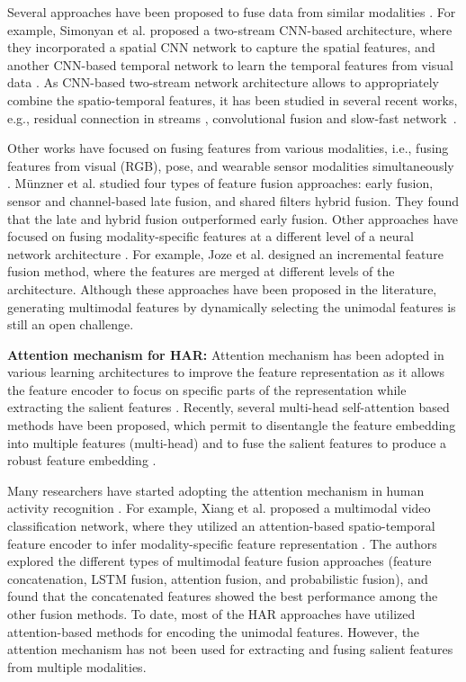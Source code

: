 \documentclass[runningheads]{llncs}
\begin{document}
Several approaches have been proposed to fuse data from similar modalities \cite{two_stream_cnn,sp_two_stream_residual,sp_mul_motion_gating,conv_fusion,zhang2018fusing}. For example, Simonyan et al. proposed a two-stream CNN-based architecture, where they incorporated a spatial CNN network to capture the spatial features, and another CNN-based temporal network to learn the temporal features from visual data \cite{two_stream_cnn}.  As CNN-based two-stream network architecture allows to appropriately combine the spatio-temporal features, it has been studied in several recent works, e.g., residual connection in streams \cite{sp_two_stream_residual}, convolutional fusion \cite{conv_fusion} and slow-fast network~\cite{slowfast}.



Other works have focused on fusing features from various modalities, i.e., fusing features from visual (RGB), pose, and wearable sensor modalities simultaneously \cite{multimodal_survey,mfas,joze2019mmtm}. M\"{u}nzner et al. \cite{fusion_approaches} studied four types of feature fusion approaches: early fusion, sensor and channel-based late fusion, and shared filters hybrid fusion. They found that the late and hybrid fusion outperformed early fusion. Other approaches have focused on fusing modality-specific features at a different level of a neural network architecture \cite{mfas}. For example, Joze et al. \cite{joze2019mmtm} designed an incremental feature fusion method, where the features are merged at different levels of the architecture.
Although these approaches have been proposed in the literature, generating multimodal features by dynamically selecting the unimodal features is still an open challenge.


\textbf{Attention mechanism for HAR:}
Attention mechanism has been adopted in various learning architectures to improve the feature representation as it allows the feature encoder to focus on specific parts of the representation while extracting the salient features \cite{attention,attention_effective_approach,xu2015show,lu2017knowing,keyless,mnih2014recurrent,lu2019vilbert,gao2019multi}. Recently, several multi-head self-attention based methods have been proposed, which permit to disentangle the feature embedding into multiple features (multi-head) and to fuse the salient features to produce a robust feature embedding \cite{transformer}. 

Many researchers have started adopting the attention mechanism in human activity recognition \cite{self_attention_iros19,keyless}. For example, Xiang et al. proposed a multimodal video classification network, where they utilized an attention-based spatio-temporal feature encoder to infer modality-specific feature representation \cite{keyless}. The authors explored the different types of multimodal feature fusion approaches (feature concatenation, LSTM fusion, attention fusion, and probabilistic fusion), and found that the concatenated features showed the best performance among the other fusion methods. To date, most of the HAR approaches have utilized attention-based methods for encoding the unimodal features. However, the attention mechanism has not been used for extracting and fusing salient features from multiple modalities.
\end{document}
